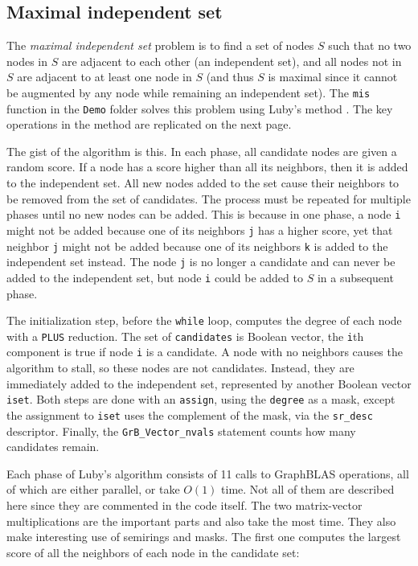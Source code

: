 \documentclass[12pt]{article}
\begin{document}
\newpage
\subsection{Maximal independent set}
\label{mis}

The {\em maximal independent set} problem is to find a set of nodes $S$ such
that no two nodes in $S$ are adjacent to each other (an independent set), and
all nodes not in $S$ are adjacent to at least one node in $S$ (and thus $S$ is
maximal since it cannot be augmented by any node while remaining an independent
set).  The \verb'mis' function in the \verb'Demo' folder solves this problem
using Luby's method \cite{Luby86}.  The key operations in the method are
replicated on the next page.

The gist of the algorithm is this.  In each phase, all candidate nodes are
given a random score.  If a node has a score higher than all its neighbors,
then it is added to the independent set.  All new nodes added to the set cause
their neighbors to be removed from the set of candidates.  The process must be
repeated for multiple phases until no new nodes can be added.  This is because
in one phase, a node \verb'i' might not be added because one of its neighbors
\verb'j' has a higher score, yet that neighbor \verb'j' might not be added
because one of its neighbors \verb'k' is added to the independent set instead.
The node \verb'j' is no longer a candidate and can never be added to the
independent set, but node \verb'i' could be added to $S$ in a subsequent phase.

The initialization step, before the \verb'while' loop, computes the degree of
each node with a \verb'PLUS' reduction.  The set of \verb'candidates' is
Boolean vector, the \verb'i'th component is true if node \verb'i' is a
candidate.  A node with no neighbors causes the algorithm to stall, so these
nodes are not candidates.  Instead, they are immediately added to the
independent set, represented by another Boolean vector \verb'iset'.  Both steps
are done with an \verb'assign', using the \verb'degree' as a mask, except the
assignment to \verb'iset' uses the complement of the mask, via the
\verb'sr_desc' descriptor.  Finally, the \verb'GrB_Vector_nvals' statement
counts how many candidates remain.

Each phase of Luby's algorithm consists of 11 calls to GraphBLAS operations,
all of which are either parallel, or take $O(1)$ time.
Not all of them are described here since they are commented in the code itself.
The two matrix-vector multiplications are the important parts and also take the
most time.  They also make interesting use of semirings and masks.  The first
one computes the largest score of all the neighbors of each node in the
candidate set:
\end{document}
